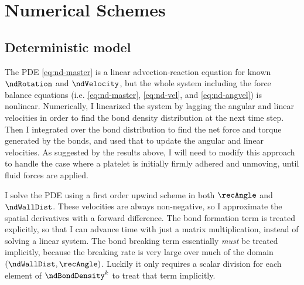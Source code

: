 
\chapter{Numerical Schemes}
\label{cha:numerical-schemes}

\section{Deterministic model}
\label{sec:deterministic-model}

The PDE \eqref{eq:nd-master} is a linear advection-reaction equation
for known $\ndRotation$ and $\ndVelocity$, but the whole system including the force
balance equations (i.e. \eqref{eq:nd-master}, \eqref{eq:nd-vel}, and
\eqref{eq:nd-angvel}) is nonlinear. Numerically, I linearized the
system by lagging the angular and linear velocities in order to find
the bond density distribution at the next time step. Then I integrated
over the bond distribution to find the net force and torque generated
by the bonds, and used that to update the angular and linear
velocities. As suggested by the results above, I will need to modify
this approach to handle the case where a platelet is initially firmly
adhered and unmoving, until fluid forces are applied.

I solve the PDE using a first order upwind scheme in both $\recAngle$ and
$\ndWallDist$. These velocities are always non-negative, so I approximate the
spatial derivatives with a forward difference. The bond formation term
is treated explicitly, so that I can advance time with just a matrix
multiplication, instead of solving a linear system. The bond breaking
term essentially \emph{must} be treated implicitly, because the
breaking rate is very large over much of the domain $(\ndWallDist,
\recAngle)$. Luckily it only requires a scalar division for each
element of $\ndBondDensity^k$ to treat that term implicitly.

